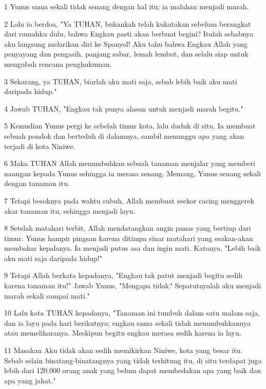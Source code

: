 \par 1 Yunus sama sekali tidak senang dengan hal itu; ia malahan menjadi marah.
\par 2 Lalu ia berdoa, "Ya TUHAN, bukankah telah kukatakan sebelum berangkat dari rumahku dulu, bahwa Engkau pasti akan berbuat begini? Itulah sebabnya aku langsung melarikan diri ke Spanyol! Aku tahu bahwa Engkau Allah yang penyayang dan pengasih, panjang sabar, lemah lembut, dan selalu siap untuk mengubah rencana penghukuman.
\par 3 Sekarang, ya TUHAN, biarlah aku mati saja, sebab lebih baik aku mati daripada hidup."
\par 4 Jawab TUHAN, "Engkau tak punya alasan untuk menjadi marah begitu."
\par 5 Kemudian Yunus pergi ke sebelah timur kota, lalu duduk di situ. Ia membuat sebuah pondok dan berteduh di dalamnya, sambil menunggu apa yang akan terjadi di kota Niniwe.
\par 6 Maka TUHAN Allah menumbuhkan sebuah tanaman menjalar yang memberi naungan kepada Yunus sehingga ia merasa senang. Memang, Yunus senang sekali dengan tanaman itu.
\par 7 Tetapi besoknya pada waktu subuh, Allah membuat seekor cacing menggerek akar tanaman itu, sehingga menjadi layu.
\par 8 Setelah matahari terbit, Allah mendatangkan angin panas yang bertiup dari timur. Yunus hampir pingsan karena ditimpa sinar matahari yang seakan-akan membakar kepalanya. Ia menjadi putus asa dan ingin mati. Katanya, "Lebih baik aku mati saja daripada hidup!"
\par 9 Tetapi Allah berkata kepadanya, "Engkau tak patut menjadi begitu sedih karena tanaman itu!" Jawab Yunus, "Mengapa tidak? Sepatutnyalah aku menjadi marah sekali sampai mati."
\par 10 Lalu kata TUHAN kepadanya, "Tanaman ini tumbuh dalam satu malam saja, dan ia layu pada hari berikutnya; engkau sama sekali tidak menumbuhkannya atau memeliharanya. Meskipun begitu engkau merasa sedih karena ia layu.
\par 11 Masakan Aku tidak akan sedih memikirkan Niniwe, kota yang besar itu. Sebab selain binatang-binatangnya yang tidak terhitung itu, di situ terdapat juga lebih dari 120.000 orang anak yang belum dapat membedakan apa yang baik dan apa yang jahat."


